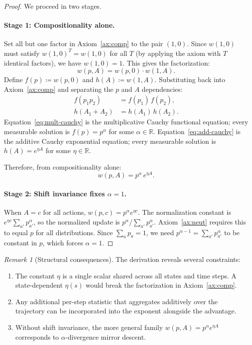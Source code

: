 \documentclass{article}
\theoremstyle{plain}
\theoremstyle{definition}
\theoremstyle{remark}
\newtheorem{remark}[theorem]{Remark}
\newcommand{\R}{\mathbb{R}}
\begin{document}
\begin{proof}
We proceed in two stages.

\paragraph{Stage 1: Compositionality alone.}
Set all but one factor in Axiom~\ref{ax:comp} to the pair $(1, 0)$. Since $w(1,0)$ must satisfy $w(1,0)^T = w(1,0)$ for all $T$ (by applying the axiom with $T$ identical factors), we have $w(1,0) = 1$. This gives the factorization:
\[
  w(p, A) = w(p, 0) \cdot w(1, A).
\]
Define $f(p) \coloneqq w(p, 0)$ and $h(A) \coloneqq w(1, A)$. Substituting back into Axiom~\ref{ax:comp} and separating the $p$ and $A$ dependencies:
\begin{align}
  f(p_1 p_2) &= f(p_1)\,f(p_2), \label{eq:mult-cauchy}\\
  h(A_1 + A_2) &= h(A_1)\,h(A_2). \label{eq:add-cauchy}
\end{align}
Equation~\eqref{eq:mult-cauchy} is the multiplicative Cauchy functional equation; every measurable solution is $f(p) = p^\alpha$ for some $\alpha \in \R$. Equation~\eqref{eq:add-cauchy} is the additive Cauchy exponential equation; every measurable solution is $h(A) = e^{\eta A}$ for some $\eta \in \R$.

Therefore, from compositionality alone:
\begin{equation}\label{eq:general}
  w(p, A) = p^\alpha\, e^{\eta A}.
\end{equation}

\paragraph{Stage 2: Shift invariance fixes $\alpha = 1$.}
When $A = c$ for all actions, $w(p, c) = p^\alpha e^{\eta c}$. The normalization constant is $e^{\eta c}\sum_{a'} p_{a'}^\alpha$, so the normalized update is $p^\alpha / \sum_{a'} p_{a'}^\alpha$. Axiom~\ref{ax:neut} requires this to equal $p$ for all distributions. Since $\sum_a p_a = 1$, we need $p^{\alpha - 1} = \sum_{a'} p_{a'}^\alpha$ to be constant in $p$, which forces $\alpha = 1$.
\end{proof}

\begin{remark}[Structural consequences]
The derivation reveals several constraints:
\begin{enumerate}[label=(\roman*)]
  \item The constant $\eta$ is a single scalar shared across all states and time steps. A state-dependent $\eta(s)$ would break the factorization in Axiom~\ref{ax:comp}.
  \item Any additional per-step statistic that aggregates additively over the trajectory can be incorporated into the exponent alongside the advantage.
  \item Without shift invariance, the more general family $w(p,A) = p^\alpha e^{\eta A}$ corresponds to $\alpha$-divergence mirror descent.
\end{enumerate}
\end{remark}
\end{document}
